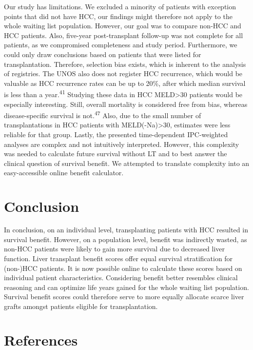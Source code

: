 \documentclass[11pt,english,]{book} %
\begin{document}
Our study has limitations. We excluded a minority of patients with exception points that did not have HCC, our findings might therefore not apply to the whole waiting list population. However, our goal was to compare non-HCC and HCC patients. Also, five-year post-transplant follow-up was not complete for all patients, as we compromised completeness and study period. Furthermore, we could only draw conclusions based on patients that were listed for transplantation. Therefore, selection bias exists, which is inherent to the analysis of registries. The UNOS also does not register HCC recurrence, which would be valuable as HCC recurrence rates can be up to 20\%, after which median survival is less than a year.\textsuperscript{41} Studying these data in HCC MELD\textgreater30 patients would be especially interesting. Still, overall mortality is considered free from bias, whereas disease-specific survival is not.\textsuperscript{47} Also, due to the small number of transplantations in HCC patients with MELD(-Na)\textgreater30, estimates were less reliable for that group. Lastly, the presented time-dependent IPC-weighted analyses are complex and not intuitively interpreted. However, this complexity was needed to calculate future survival without LT and to best answer the clinical question of survival benefit. We attempted to translate complexity into an easy-accessible online benefit calculator.

\hypertarget{conclusion-4}{%
\section*{Conclusion}\label{conclusion-4}}

In conclusion, on an individual level, transplanting patients with HCC resulted in survival benefit. However, on a population level, benefit was indirectly wasted, as non-HCC patients were likely to gain more survival due to decreased liver function. Liver transplant benefit scores offer equal survival stratification for (non-)HCC patients. It is now possible online to calculate these scores based on individual patient characteristics. Considering benefit better resembles clinical reasoning and can optimize life years gained for the whole waiting list population. Survival benefit scores could therefore serve to more equally allocate scarce liver grafts amongst patients eligible for transplantation.

\newpage
\linespread{1}
\small

\hypertarget{references-5}{%
\section*{References}\label{references-5}}
\end{document}
